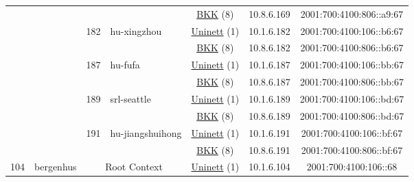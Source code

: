 \begin{small}
\begin{center}
\begin{longtable}{|c|c|c|c|c|c|c|c|}
  &  &  &  & \multicolumn{2}{|c|}{\tiny{\href{http://bkk.no}{BKK} (8)}} & \tiny{10.8.6.169} & \tiny{2001:700:4100:806::a9:67} \\* \cline{3-3}\cline{4-4}\cline{5-5}\cline{6-6}\cline{7-7}\cline{8-8}
  &  & \multirow{2}{*}{\tiny{182}} & \multicolumn{1}{|l|}{\multirow{2}{*}{\tiny{hu-xingzhou}}} & \multicolumn{2}{|c|}{\tiny{\href{https://www.uninett.no}{Uninett} (1)}} & \tiny{10.1.6.182} & \tiny{2001:700:4100:106::b6:67} \\* \cline{5-5}\cline{6-6}\cline{7-7}\cline{8-8}
  &  &  &  & \multicolumn{2}{|c|}{\tiny{\href{http://bkk.no}{BKK} (8)}} & \tiny{10.8.6.182} & \tiny{2001:700:4100:806::b6:67} \\* \cline{3-3}\cline{4-4}\cline{5-5}\cline{6-6}\cline{7-7}\cline{8-8}
  &  & \multirow{2}{*}{\tiny{187}} & \multicolumn{1}{|l|}{\multirow{2}{*}{\tiny{hu-fufa}}} & \multicolumn{2}{|c|}{\tiny{\href{https://www.uninett.no}{Uninett} (1)}} & \tiny{10.1.6.187} & \tiny{2001:700:4100:106::bb:67} \\* \cline{5-5}\cline{6-6}\cline{7-7}\cline{8-8}
  &  &  &  & \multicolumn{2}{|c|}{\tiny{\href{http://bkk.no}{BKK} (8)}} & \tiny{10.8.6.187} & \tiny{2001:700:4100:806::bb:67} \\* \cline{3-3}\cline{4-4}\cline{5-5}\cline{6-6}\cline{7-7}\cline{8-8}
  &  & \multirow{2}{*}{\tiny{189}} & \multicolumn{1}{|l|}{\multirow{2}{*}{\tiny{srl-seattle}}} & \multicolumn{2}{|c|}{\tiny{\href{https://www.uninett.no}{Uninett} (1)}} & \tiny{10.1.6.189} & \tiny{2001:700:4100:106::bd:67} \\* \cline{5-5}\cline{6-6}\cline{7-7}\cline{8-8}
  &  &  &  & \multicolumn{2}{|c|}{\tiny{\href{http://bkk.no}{BKK} (8)}} & \tiny{10.8.6.189} & \tiny{2001:700:4100:806::bd:67} \\* \cline{3-3}\cline{4-4}\cline{5-5}\cline{6-6}\cline{7-7}\cline{8-8}
  &  & \multirow{2}{*}{\tiny{191}} & \multicolumn{1}{|l|}{\multirow{2}{*}{\tiny{hu-jiangshuihong}}} & \multicolumn{2}{|c|}{\tiny{\href{https://www.uninett.no}{Uninett} (1)}} & \tiny{10.1.6.191} & \tiny{2001:700:4100:106::bf:67} \\* \cline{5-5}\cline{6-6}\cline{7-7}\cline{8-8}
  &  &  &  & \multicolumn{2}{|c|}{\tiny{\href{http://bkk.no}{BKK} (8)}} & \tiny{10.8.6.191} & \tiny{2001:700:4100:806::bf:67} \\ \hline
 \multirow{22}{*}{\tiny{104}} & \multicolumn{1}{|l|}{\multirow{22}{*}{\tiny{bergenhus}}} & \multicolumn{2}{|c|}{\multirow{2}{*}{\tiny{Root Context}}} & \multicolumn{2}{|c|}{\tiny{\href{https://www.uninett.no}{Uninett} (1)}} & \tiny{10.1.6.104} & \tiny{2001:700:4100:106::68} \\* \cline{5-5}\cline{6-6}\cline{7-7}\cline{8-8}

\end{longtable}
\end{center}
\end{small}

